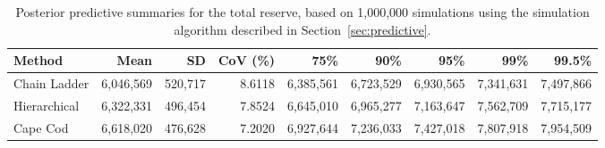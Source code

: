 \begin{table}[htbp]
\centering
\begin{tabular}{lrrrrrrrr}
\toprule
Method & Mean & SD & CoV (\%)& 75\% & 90\% & 95\% & 99\% & 99.5\% \\
\midrule
Chain Ladder & 6,046,569 & 520,717 & 8.6118 & 6,385,561 & 6,723,529 & 6,930,565 & 7,341,631 & 7,497,866 \\
Hierarchical & 6,322,331 & 496,454 & 7.8524 & 6,645,010 & 6,965,277 & 7,163,647 & 7,562,709 & 7,715,177 \\
Cape Cod & 6,618,020 & 476,628 & 7.2020 & 6,927,644 & 7,236,033 & 7,427,018 & 7,807,918 & 7,954,509 \\
\bottomrule
\end{tabular}
\caption{Posterior predictive summaries for the total reserve, based on 1,000,000 simulations using the simulation algorithm described in Section~\ref{sec:predictive}.}
\label{tab:saluz_predictive_summary}
\end{table}